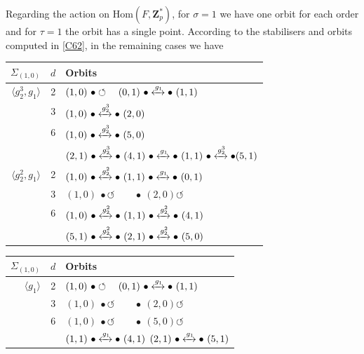\documentclass[12pt]{article}
\theoremstyle{definition}
\newcommand{\Z}{\mathbf Z}
\newcommand{\Hom}{\mathrm{Hom}}
\begin{document}
Regarding the action on $\Hom(F,\Z_p^*)$, for $\sigma=1$ we have one orbit for each order and for $\tau=1$ the orbit has a single point. According to the stabilisers and orbits computed in \ref{C62}, in the remaining cases we have
\begin{center}
	\begin{tabular}{r|c l}
		$\Sigma_{(1,0)}$    & $d$ & Orbits \\
		\hline
		$\langle g_2^3, g_1\rangle$  & 2 & $(1,0)\ \bullet \circlearrowleft\quad (0,1)\ \bullet \xleftrightarrow{g_1}\bullet\ (1,1)$\\ [1ex]
		& 3 & $(1,0)\ \bullet \xleftrightarrow{g_2^3}\bullet\ (2,0)$\\ [1ex]
		&6 & $(1,0)\ \bullet \xleftrightarrow{g_2^3}\bullet\  (5,0)$\\ [1ex]
		& & $(2,1)\ \bullet \xleftrightarrow{g_2^3}\bullet\   (4,1)\ \bullet \xleftrightarrow{g_1}\bullet\   (1,1)\ \bullet \xleftrightarrow{g_2^3}\bullet  (5,1)$\\ [1ex]
		\hline
		$\langle g_2^2, g_1\rangle$  & 2 &  $(1,0)\ \bullet\xleftrightarrow{g_2^2} \bullet \ (1,1)\ \bullet \xleftrightarrow{g_1}\bullet\ (0,1)$\\ [1ex]
		& 3 & $(1,0)\ \bullet \circlearrowleft \qquad \bullet\ (2,0) \circlearrowleft$\\ [1ex]
		&6 & $(1,0)\ \bullet \xleftrightarrow{g_2^2}\bullet\  (1,1)\   \bullet \xleftrightarrow{g_2^2}
		\bullet\  (4,1)$\\ [1ex]
		& & $(5,1)\ \bullet \xleftrightarrow{g_2^2}\bullet\  (2,1)\   \bullet \xleftrightarrow{g_2^2}
		\bullet\  (5,0)$\\
		\end{tabular}
\end{center}
        \begin{center}
	\begin{tabular}{r|c l}
		$\Sigma_{(1,0)}$    & $d$ & Orbits \\
		\hline
		$\langle g_1\rangle$  &2 & $(1,0)\ \bullet \circlearrowleft\quad (0,1)\ \bullet \xleftrightarrow{g_1}\bullet\ (1,1)$\\ [2ex]
		& 3 &$(1,0)\ \bullet \circlearrowleft \qquad \bullet\ (2,0) \circlearrowleft$\\ [2ex]
		&6 & $(1,0)\ \bullet \circlearrowleft \qquad \bullet\ (5,0) \circlearrowleft$\\ [2ex]
		& & $(1,1)\ \bullet \xleftrightarrow{g_1}\bullet\ (4,1)$
		\qquad $(2,1)\ \bullet \xleftrightarrow{g_1}\bullet\ (5,1)$\\ [2ex]
\end{tabular}
\end{center}	
\end{document}
